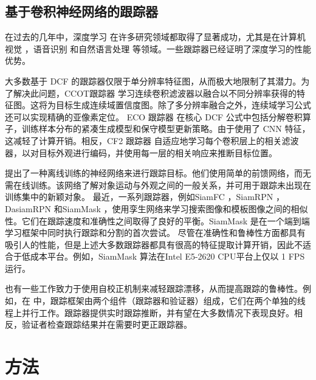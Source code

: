 \subsection{基于卷积神经网络的跟踪器}
在过去的几年中，深度学习 \cite{Goodfellow2015DeepL} 在许多研究领域都取得了显著成功，尤其是在计算机视觉 \cite{Matiz2019InductiveCP, Zhu2019RotatedCR, Xiao2019DenseSE}，语音识别 \cite{Kim2016JointCB, Liu2019AttentionGD}和自然语言处理 \cite{Vinyals2014GrammarAA, Yousfi2017ContributionOR} 等领域。一些跟踪器已经证明了深度学习的性能优势。

大多数基于 DCF 的跟踪器仅限于单分辨率特征图，从而极大地限制了其潜力。为了解决此问题，CCOT跟踪器 \cite{CCOT} 学习连续卷积滤波器以融合以不同分辨率获得的特征图。这将为目标生成连续域置信度图。除了多分辨率融合之外，连续域学习公式还可以实现精确的亚像素定位。
ECO 跟踪器 \cite{Danelljan2017ECOEC} 在核心 DCF 公式中包括分解卷积算子，训练样本分布的紧凑生成模型和保守模型更新策略。由于使用了 CNN 特征，这减轻了计算开销。相反，CF2 跟踪器 \cite{Ma2015HierarchicalCF} 自适应地学习每个卷积层上的相关滤波器，以对目标外观进行编码，并使用每一层的相关响应来推断目标位置。

\cite{GOTURN} 提出了一种离线训练的神经网络来进行跟踪目标。他们使用简单的前馈网络，而无需在线训练。该网络了解对象运动与外观之间的一般关系，并可用于跟踪未出现在训练集中的新颖对象。
最近，一系列跟踪器，例如SiamFC \cite{SiamFC}，SiamRPN \cite{SiamRPN}，DasiamRPN \cite{zhu2018distractor} 和SiamMask \cite{Wang2018SiamMask}，使用孪生网络来学习搜索图像和模板图像之间的相似性。它们在跟踪速度和准确性之间取得了良好的平衡。SiamMask 是在一个端到端学习框架中同时执行跟踪和分割的首次尝试。
尽管在准确性和鲁棒性方面都具有吸引人的性能，但是上述大多数跟踪器都具有很高的特征提取计算开销，因此不适合于低成本平台。例如，SiamMask 算法在Intel E5-2620 CPU平台上仅以 1 FPS 运行。

也有一些工作致力于使用自校正机制来减轻跟踪漂移，从而提高跟踪的鲁棒性。例如，在 \cite{fan2018parallel} 中，跟踪框架由两个组件（跟踪器和验证器）组成，它们在两个单独的线程上并行工作。跟踪器提供实时跟踪推断，并有望在大多数情况下表现良好。相反，验证者检查跟踪结果并在需要时更正跟踪器。

\section{方法}

